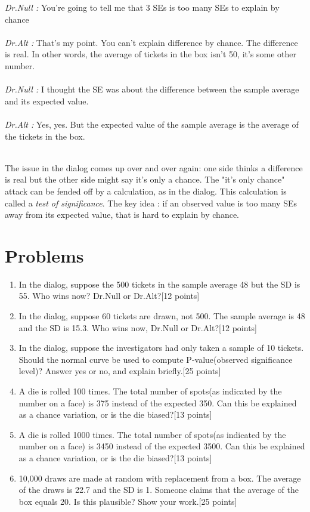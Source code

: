 \documentclass[12pt, oneside]{article}
\begin{document}
 \textit{Dr.Null : }You're going to tell me that 3 SEs is too many SEs to explain by chance\\\\
 \textit{Dr.Alt : }That's my point. You can't explain difference by chance. The difference is real. In other words, the average of tickets in the box isn't 50, it's some other number.\\\\
 \textit{Dr.Null : }I thought the SE was about the difference between the sample average and its expected value.\\\\
 \textit{Dr.Alt : }Yes, yes. But the expected value of the sample average is the average of the tickets in the box.\\\\
 
 \par
 The issue in the dialog comes up over and over again: one side thinks a difference is real but the other side might say it's only a chance. The "it's only chance" attack can be fended off by a calculation, as in the dialog. This calculation is called a \textit{test of significance}. The key idea : if an observed value is too many SEs away from its expected value, that is hard to explain by chance.
 
 
 
 
 
\newpage 
\section{Problems}
\begin{enumerate}
\item In the dialog, suppose the 500 tickets in the sample average 48 but the SD is 55. Who wins now? Dr.Null or Dr.Alt?[12 points]
\newpage
\item In the dialog, suppose 60 tickets are drawn, not 500. The sample average is 48 and the SD is 15.3. Who wins now, Dr.Null or Dr.Alt?[12 points]
\newpage
\item In the dialog, suppose the investigators had only taken a sample of 10 tickets. Should the normal curve be used to compute P-value(observed significance level)? Answer yes or no, and explain briefly.[25 points]
\newpage
\item A die is rolled 100 times. The total number of spots(as indicated by the number on a face) is 375 instead of the expected 350. Can this be explained as a chance variation, or is the die biased?[13 points]
\newpage
\item A die is rolled 1000 times. The total number of spots(as indicated by the number on a face) is 3450 instead of the expected 3500. Can this be explained as a chance variation, or is the die biased?[13 points]
\newpage
\item 10,000 draws are made at random with replacement from a box. The average of the draws is 22.7 and the SD is 1. Someone claims that the average of the box equals 20. Is this plausible? Show your work.[25 points]


\end{enumerate}
\end{document}
